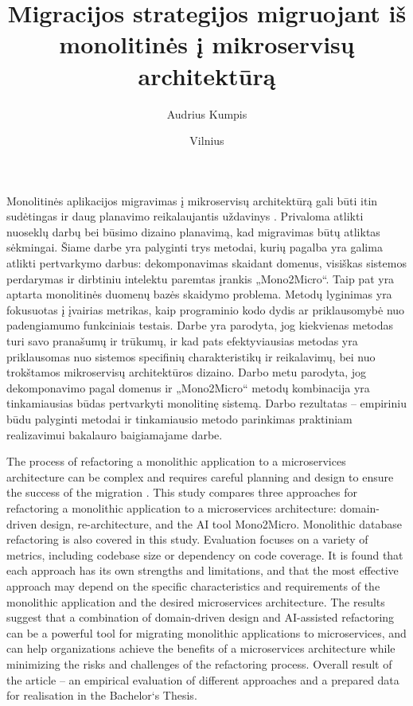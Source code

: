 \documentclass[fleqn]{VUMIFPSkursinis}
\title{Migracijos strategijos migruojant iš monolitinės į mikroservisų architektūrą}
\author{Audrius Kumpis}
\date{Vilnius \\ \the\year}
\begin{document}
\maketitle

\tableofcontents

Monolitinės aplikacijos migravimas į mikroservisų architektūrą gali būti itin sudėtingas ir daug planavimo reikalaujantis uždavinys \cite{FBZ+19}. Privaloma atlikti nuoseklų darbų bei būsimo dizaino planavimą, kad migravimas būtų atliktas sėkmingai. Šiame darbe yra palyginti trys metodai, kurių pagalba yra galima atlikti pertvarkymo darbus: dekomponavimas skaidant domenus, visiškas sistemos perdarymas ir dirbtiniu intelektu paremtas įrankis „Mono2Micro“. Taip pat yra aptarta monolitinės duomenų bazės skaidymo problema. Metodų lyginimas yra fokusuotas į įvairias metrikas, kaip programinio kodo dydis ar priklausomybė nuo padengiamumo funkciniais testais. Darbe yra parodyta, jog kiekvienas metodas turi savo pranašumų ir trūkumų, ir kad pats efektyviausias metodas yra priklausomas nuo sistemos specifinių charakteristikų ir reikalavimų, bei nuo trokštamos mikroservisų architektūros dizaino. Darbo metu parodyta, jog dekomponavimo pagal domenus ir „Mono2Micro“ metodų kombinacija yra tinkamiausias būdas pertvarkyti monolitinę sistemą. Darbo rezultatas – empiriniu būdu  palyginti metodai ir tinkamiausio metodo parinkimas praktiniam realizavimui bakalauro baigiamajame darbe.

The process of refactoring a monolithic application to a microservices architecture can be complex and requires careful planning and design to ensure the success of the migration \cite{FBZ+19}. This study compares three approaches for refactoring a monolithic application to a microservices architecture: domain-driven design, re-architecture, and the AI tool Mono2Micro. Monolithic database refactoring is also covered in this study. Evaluation focuses on a variety of metrics, including codebase size or dependency on code coverage. It is found that each approach has its own strengths and limitations, and that the most effective approach may depend on the specific characteristics and requirements of the monolithic application and the desired microservices architecture. The results suggest that a combination of domain-driven design and AI-assisted refactoring can be a powerful tool for migrating monolithic applications to microservices, and can help organizations achieve the benefits of a microservices architecture while minimizing the risks and challenges of the refactoring process. Overall result of the article – an empirical evaluation of different approaches and a prepared data for realisation in the Bachelor‘s Thesis.
\end{document}

